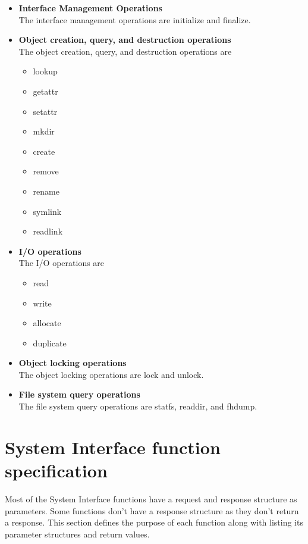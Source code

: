 \documentclass[11pt, letterpaper]{article}
\begin{document}
\begin{itemize}
\item\textbf{Interface Management Operations}\\
The interface management operations are initialize and finalize.

\item\textbf{Object creation, query, and destruction operations}\\
The object creation, query, and destruction operations are 
\begin{itemize}
\item lookup
\item getattr
\item setattr
\item mkdir
\item create
\item remove
\item rename
\item symlink
\item readlink
\end{itemize}

\item\textbf{I/O operations}\\
The I/O operations are
\begin{itemize}
\item read
\item write
\item allocate
\item duplicate
\end{itemize}

\item\textbf{Object locking operations}\\
The object locking operations are lock and unlock.

\item\textbf{File system query operations}\\
The file system query operations are statfs, readdir, and fhdump.
\end{itemize}

\section{System Interface function specification}

Most of the System Interface functions have a request and response
structure as parameters. Some functions don't have a response structure
as they don't return a response. This section defines the purpose of
each function along with listing its parameter structures and return
values.
\end{document}
